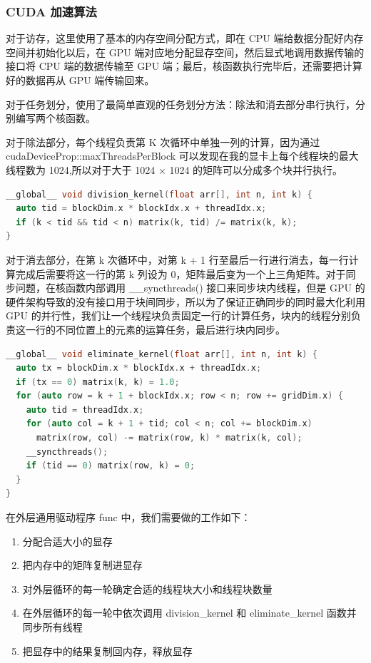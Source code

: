 \documentclass[a4paper]{article}
\begin{document}
\subsubsection{CUDA 加速算法}
对于访存，这里使用了基本的内存空间分配方式，即在 CPU 端给数据分配好内存空间并初始化以后，在 GPU 端对应地分配显存空间，然后显式地调用数据传输的接口将 CPU 端的数据传输至 GPU 端；最后，核函数执行完毕后，还需要把计算好的数据再从 GPU 端传输回来。

对于任务划分，使用了最简单直观的任务划分方法：除法和消去部分串行执行，分别编写两个核函数。

对于除法部分，每个线程负责第 K 次循环中单独一列的计算，因为通过 cudaDeviceProp::maxThreadsPerBlock 可以发现在我的显卡上每个线程块的最大线程数为 1024,所以对于大于 1024 × 1024 的矩阵可以分成多个块并行执行。

\begin{lstlisting}[frame=trbl,language={C++}]
__global__ void division_kernel(float arr[], int n, int k) {
  auto tid = blockDim.x * blockIdx.x + threadIdx.x;
  if (k < tid && tid < n) matrix(k, tid) /= matrix(k, k);
}
\end{lstlisting}

对于消去部分，在第 k 次循环中，对第 k + 1 行至最后一行进行消去，每一行计算完成后需要将这一行的第 k 列设为 0，矩阵最后变为一个上三角矩阵。对于同步问题，在核函数内部调用 \_\_syncthreads() 接口来同步块内线程，但是 GPU 的硬件架构导致的没有接口用于块间同步，所以为了保证正确同步的同时最大化利用 GPU 的并行性，我们让一个线程块负责固定一行的计算任务，块内的线程分别负责这一行的不同位置上的元素的运算任务，最后进行块内同步。

\begin{lstlisting}[frame=trbl,language={C++}]
__global__ void eliminate_kernel(float arr[], int n, int k) {
  auto tx = blockDim.x * blockIdx.x + threadIdx.x;
  if (tx == 0) matrix(k, k) = 1.0;
  for (auto row = k + 1 + blockIdx.x; row < n; row += gridDim.x) {
    auto tid = threadIdx.x;
    for (auto col = k + 1 + tid; col < n; col += blockDim.x)
      matrix(row, col) -= matrix(row, k) * matrix(k, col);
    __syncthreads();
    if (tid == 0) matrix(row, k) = 0;
  }
}
\end{lstlisting}

在外层通用驱动程序 func 中，我们需要做的工作如下：
\begin{enumerate}
  \item 分配合适大小的显存
  \item 把内存中的矩阵复制进显存
  \item 对外层循环的每一轮确定合适的线程块大小和线程块数量
  \item 在外层循环的每一轮中依次调用 division\_kernel 和 eliminate\_kernel 函数并同步所有线程
  \item 把显存中的结果复制回内存，释放显存
\end{enumerate}
\end{document}
